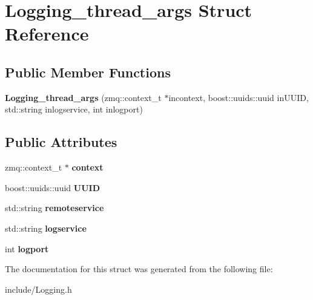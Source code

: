 \hypertarget{structLogging__thread__args}{\section{Logging\-\_\-thread\-\_\-args Struct Reference}
\label{structLogging__thread__args}
}
\subsection*{Public Member Functions}
\begin{DoxyCompactItemize}
\item 
\hypertarget{structLogging__thread__args_a9496cec11539e17b104d3cbdf3174fdb}{{\bfseries Logging\-\_\-thread\-\_\-args} (zmq\-::context\-\_\-t $\ast$incontext, boost\-::uuids\-::uuid in\-U\-U\-I\-D, std\-::string inlogservice, int inlogport)}\label{structLogging__thread__args_a9496cec11539e17b104d3cbdf3174fdb}

\end{DoxyCompactItemize}
\subsection*{Public Attributes}
\begin{DoxyCompactItemize}
\item 
\hypertarget{structLogging__thread__args_addacf7a55861c13832a75b88d74c006c}{zmq\-::context\-\_\-t $\ast$ {\bfseries context}}\label{structLogging__thread__args_addacf7a55861c13832a75b88d74c006c}

\item 
\hypertarget{structLogging__thread__args_a3a7c5617b7fa5214c6da407a23266d57}{boost\-::uuids\-::uuid {\bfseries U\-U\-I\-D}}\label{structLogging__thread__args_a3a7c5617b7fa5214c6da407a23266d57}

\item 
\hypertarget{structLogging__thread__args_aca2cf6dcba1d9051506134e9bf26d786}{std\-::string {\bfseries remoteservice}}\label{structLogging__thread__args_aca2cf6dcba1d9051506134e9bf26d786}

\item 
\hypertarget{structLogging__thread__args_a5a8e255209f5c171a7fbd78f0e308087}{std\-::string {\bfseries logservice}}\label{structLogging__thread__args_a5a8e255209f5c171a7fbd78f0e308087}

\item 
\hypertarget{structLogging__thread__args_ad5ab1c21e226a694c7f813bcb3ef9002}{int {\bfseries logport}}\label{structLogging__thread__args_ad5ab1c21e226a694c7f813bcb3ef9002}

\end{DoxyCompactItemize}


The documentation for this struct was generated from the following file\-:\begin{DoxyCompactItemize}
\item 
include/Logging.\-h\end{DoxyCompactItemize}
